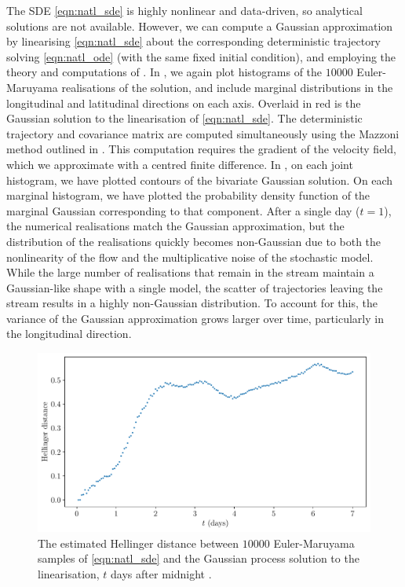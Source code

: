 The SDE \cref{eqn:natl_sde} is highly nonlinear and data-driven, so analytical solutions are not available.
However, we can compute a Gaussian approximation by linearising \cref{eqn:natl_sde} about the corresponding deterministic trajectory solving \cref{eqn:natl_ode} (with the same fixed initial condition), and employing the theory and computations of .
In , we again plot histograms of the \(10000\) Euler-Maruyama realisations of the solution, and include marginal distributions in the longitudinal and latitudinal directions on each axis.
Overlaid in red is the Gaussian solution to the linearisation of \cref{eqn:natl_sde}.
The deterministic trajectory and covariance matrix are computed simultaneously using the Mazzoni method outlined in .
This computation requires the gradient of the velocity field, which we approximate with a centred finite difference.
In , on each joint histogram, we have plotted contours of the bivariate Gaussian solution.
On each marginal histogram, we have plotted the probability density function of the marginal Gaussian corresponding to that component.
After a single day (\(t = 1\)), the numerical realisations match the Gaussian approximation, but the distribution of the realisations quickly becomes non-Gaussian due to both the nonlinearity of the flow and the multiplicative noise of the stochastic model.
While the large number of realisations that remain in the stream maintain a Gaussian-like shape with a single model, the scatter of trajectories leaving the stream results in a highly non-Gaussian distribution.
To account for this, the variance of the Gaussian approximation grows larger over time, particularly in the longitudinal direction.

\begin{figure}
	\centering
	\includegraphics[width=\textwidth]{chp06_applications/figures/gulf_stream/traj_stoch_hell_dist_0.25}
	\caption{The estimated Hellinger distance between \(10000\) Euler-Maruyama samples of \cref{eqn:natl_sde} and the Gaussian process solution to the linearisation, \(t\) days after midnight .}
	\label{fig:natl_hell}
\end{figure}

